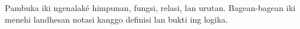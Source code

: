 \documentclass[../../include/open-logic-part]{subfiles}
\begin{document}

\begin{editorial}
Pambuka iki ngenalaké himpunan, fungsi, relasi, lan urutan. Bagean-bagean iki menehi landhesan notasi kanggo definisi lan bukti ing logika.
\end{editorial}





\OLEndPartHook
\end{document}
